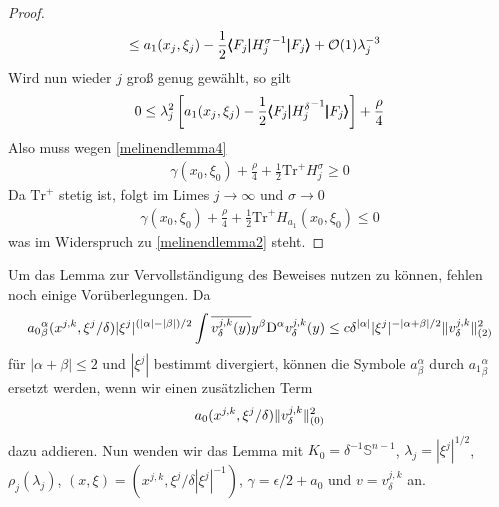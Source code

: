 \begin{proof}
\begin{align}
\begin{split}
&\le a_1(x_j,\xi_j) - \frac 1 2\pmb\langle F_j\pmb|{H_j^\sigma}^{-1}\pmb|F_j\pmb\rangle  + \mathcal O(1)\lambda_j^{-3}
\end{split}
\end{align}
Wird nun wieder $j$ groß genug gewählt, so gilt
\begin{align}
0\le \lambda_j^2\left[ a_1(x_j,\xi_j) - \frac{1}{2}\pmb\langle F_j\pmb|{H_j^\delta}^{-1}\pmb|F_j\pmb\rangle \right]  +\frac\rho 4
\end{align}
Also muss wegen \eqref{melinendlemma4}
\begin{align}
\gamma(x_0,\xi_0) + \frac \rho 4 + \frac 1 2 \mathrm{Tr}^+ H_j^\sigma\ge 0
\end{align}
Da $\mathrm{Tr}^+$ stetig ist, folgt im Limes $j\to\infty$ und $\sigma\to 0$
\begin{align}
\gamma(x_0,\xi_0) + \frac \rho 4 + \frac 1 2 \mathrm{Tr}^+ H_{a_1}(x_0,\xi_0)\le 0
\end{align}
was im Widerspruch zu \eqref{melinendlemma2} steht.
\end{proof}

Um das Lemma zur Vervollständigung des Beweises nutzen zu können, fehlen noch einige Vorüberlegungen. Da
\begin{align}
{a_0}^\alpha_\beta(x^{j,k},\xi^j/\delta)|\xi^j|^{(|\alpha|-|\beta|)/2}\int \overline{v^{j,k}_\delta(y)}y^\beta\mathrm D^\alpha v^{j,k}_\delta(y) \le c \delta^{\lvert\alpha\rvert}|\xi^j|^{-|\alpha+\beta|/2}\lVert v^{j,k}_\delta\rVert_{(2)}^2
\end{align}
für $|\alpha+\beta|\le 2$ und $|\xi^j|$ bestimmt divergiert, können die Symbole $a^\alpha_\beta$ durch ${a_1}^\alpha_\beta$ ersetzt werden, wenn wir einen zusätzlichen Term
\begin{align}
{a_0}(x^{j,k},\xi^j/\delta)\lVert v^{j,k}_\delta\rVert_{(0)}^2
\end{align}
dazu addieren. Nun wenden wir das Lemma mit $K_0=\delta^{-1}\mathbb{S}^{n-1}$, $\lambda_j=|\xi^j|^{1/2}$, $\rho_j(\lambda_j)$, $(x,\xi)=(x^{j,k},\xi^j/\delta|\xi^j|^{-1})$, $\gamma = \epsilon/2 + a_0$ und $v=v^{j,k}_\delta$  an.
